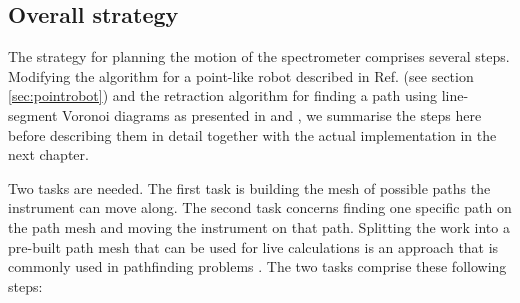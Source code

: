 \subsection{Overall strategy}
\label{sec:strategy}

The strategy for planning the motion of the spectrometer comprises several steps. 
Modifying the algorithm for a point-like robot described in Ref. 
\cite[Ch. 13, pp. 283-306]{Berg2008} (see section \ref{sec:pointrobot}) and the 
retraction algorithm for finding a path using line-segment Voronoi diagrams as 
presented in \cite[p. 163]{Berg2008} and \cite[pp. 247-251]{FUH_geo2020}, we 
summarise the steps here before describing them in detail together with the actual
implementation in the next chapter.

Two tasks are needed. The first task is building the mesh of possible paths the 
instrument can move along. 
The second task concerns finding one specific path on the path mesh and moving
the instrument on that path. 
Splitting the work into a pre-built path mesh that can be used for live calculations
is an approach that is commonly used in pathfinding problems \cite{Hwang2003, Choset2010_ch5}.
The two tasks comprise these following steps:
